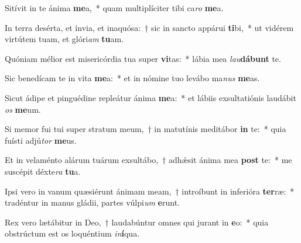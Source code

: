 \item Sitívit in te ánima \textbf{me}a,~* quam multiplíciter tibi ca\textit{ro} \textbf{me}a.
\item In terra desérta, et ínvia, et inaquósa:~† sic in sancto appárui \textbf{ti}bi,~* ut vidérem virtútem tuam, et glóri\textit{am} \textbf{tu}am.
\item Quóniam mélior est misericórdia tua super \textbf{vi}tas:~* lábia mea \textit{lau}\textbf{dá}\textbf{bunt} te.
\item Sic benedícam te in vita \textbf{me}a:~* et in nómine tuo levábo ma\textit{nus} \textbf{me}as.
\item Sicut ádipe et pinguédine repleátur ánima \textbf{me}a:~* et lábiis exsultatiónis laudábit \textit{os} \textbf{me}um.
\item Si memor fui tui super stratum meum,~† in matutínis meditábor \textbf{in} te:~* quia fuísti adjú\textit{tor} \textbf{me}us.
\item Et in velaménto alárum tuárum exsultábo,~† adhǽsit ánima mea \textbf{post} te:~* me suscépit déxte\textit{ra} \textbf{tu}a.
\item Ipsi vero in vanum quæsiérunt ánimam meam,~† introíbunt in inferióra \textbf{ter}ræ:~* tradéntur in manus gládii, partes vúlpi\textit{um} \textbf{e}runt.
\item Rex vero lætábitur in Deo,~† laudabúntur omnes qui jurant in \textbf{e}o:~* quia obstrúctum est os loquéntium \textit{in}\textbf{í}qua.
